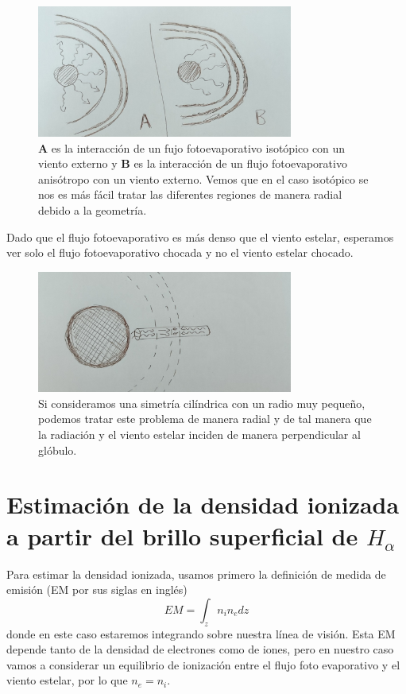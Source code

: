\documentclass{book}
\begin{document}
\begin{figure}[h]
    \centering
    \includegraphics[width=0.75\textwidth]{Chp2_iso&ans.jpg}
    \caption{\textbf{A} es la interacción de un fujo fotoevaporativo isotópico con un viento externo y \textbf{B} es la interacción de un flujo fotoevaporativo anisótropo con un viento externo. Vemos que en el caso isotópico se nos es más fácil tratar las diferentes regiones de manera radial debido a la geometría.}
    \label{fig:isotyaniso}
\end{figure}

Dado que el flujo fotoevaporativo es más denso que el viento estelar, esperamos ver solo el flujo fotoevaporativo chocada y no el viento estelar chocado.

\begin{figure}[h]
    \centering
    \includegraphics[width=0.75\textwidth]{Chp2_cilinders.jpg}
    \caption{Si consideramos una simetría cilíndrica con un radio muy pequeño, podemos tratar este problema de manera radial y de tal manera que la radiación y el viento estelar inciden de manera perpendicular al glóbulo.}
    \label{fig:cilinders}
\end{figure}

\section{Estimación de la densidad ionizada a partir del brillo superficial de $H_\alpha$}

Para estimar la densidad ionizada, usamos primero la definición de medida de emisión (EM por sus siglas en inglés)
\[EM=\int_z n_in_edz\] donde en este caso estaremos integrando sobre nuestra línea de visión. Esta EM depende tanto de la densidad de electrones como de iones, pero en nuestro caso vamos a considerar un equilibrio de ionización entre el flujo foto evaporativo y el viento estelar, por lo que $n_e=n_i$.
\end{document}
